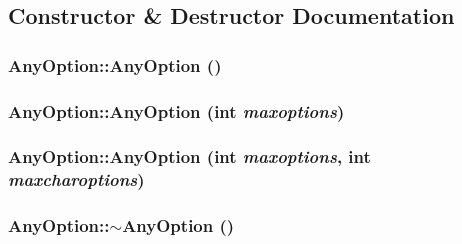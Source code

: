 \subsection{Constructor \& Destructor Documentation}
\hypertarget{classAnyOption_a7ad756bb8efd62d1a808b0ee7add6990}{
\subsubsection[{AnyOption}]{\setlength{\rightskip}{0pt plus 5cm}AnyOption::AnyOption ()}}
\label{classAnyOption_a7ad756bb8efd62d1a808b0ee7add6990}
\hypertarget{classAnyOption_a3feb7eaa2c8222054ca745a5aa6916a2}{
\subsubsection[{AnyOption}]{\setlength{\rightskip}{0pt plus 5cm}AnyOption::AnyOption (int {\em maxoptions})}}
\label{classAnyOption_a3feb7eaa2c8222054ca745a5aa6916a2}
\hypertarget{classAnyOption_a8a88d8d2f9345018acb3b6f5993cbddd}{
\subsubsection[{AnyOption}]{\setlength{\rightskip}{0pt plus 5cm}AnyOption::AnyOption (int {\em maxoptions}, \/  int {\em maxcharoptions})}}
\label{classAnyOption_a8a88d8d2f9345018acb3b6f5993cbddd}
\hypertarget{classAnyOption_a98c6f71109a04081087f967d31f77965}{
\subsubsection[{$\sim$AnyOption}]{\setlength{\rightskip}{0pt plus 5cm}AnyOption::$\sim$AnyOption ()}}
\label{classAnyOption_a98c6f71109a04081087f967d31f77965}


